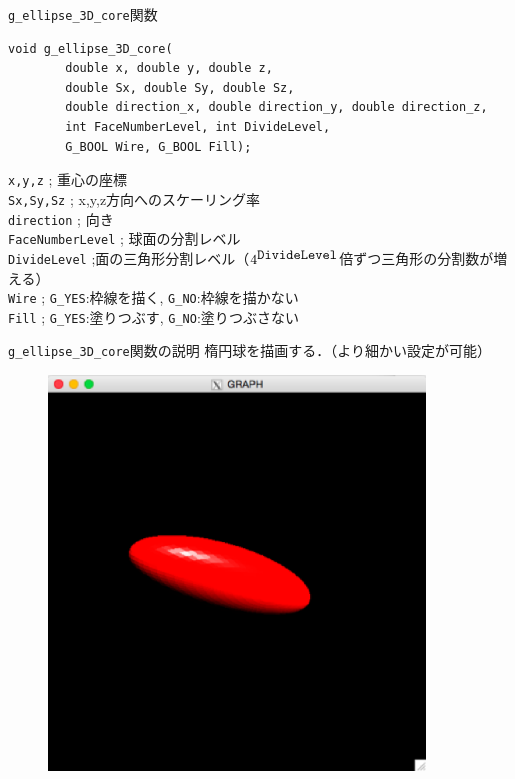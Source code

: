 \documentclass[platex,a4paper,12pt]{jsarticle}%
\begin{document}
\begin{itembox}[l]{\texttt{g\_ellipse\_3D\_core}関数}
\begin{verbatim}
void g_ellipse_3D_core(
        double x, double y, double z,
        double Sx, double Sy, double Sz,
        double direction_x, double direction_y, double direction_z,
        int FaceNumberLevel, int DivideLevel, 
        G_BOOL Wire, G_BOOL Fill);   
\end{verbatim}
\verb|x,y,z| ; 重心の座標\\
\verb|Sx,Sy,Sz| ; x,y,z方向へのスケーリング率\\
\verb|direction| ; 向き\\
\verb|FaceNumberLevel| ; 球面の分割レベル\\
\verb|DivideLevel| ;面の三角形分割レベル（$4^{\verb|DivideLevel|}$倍ずつ三角形の分割数が増える）\\
\verb|Wire| ; \verb|G_YES|:枠線を描く, \verb|G_NO|:枠線を描かない \\
\verb|Fill| ; \verb|G_YES|:塗りつぶす, \verb|G_NO|:塗りつぶさない
\end{itembox}

\begin{itembox}[l]{\texttt{g\_ellipse\_3D\_core}関数の説明}
楕円球を描画する．（より細かい設定が可能）
\end{itembox}

\begin{figure}[htb]
	\includegraphics[width=100mm]{./Figures/eps/Canvas_g_ellipse.eps}
\end{figure}
\end{document}
